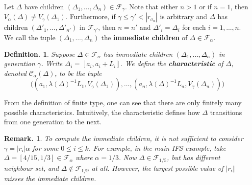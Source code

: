 \documentclass[11pt, a4paper]{memoir}
\theoremstyle{change}
\theoremstyle{plain}
\theoremstyle{nonumberplain}
\newtheorem{definition}{Definition.}
\newtheorem{remark}{Remark.}
\numberwithin{equation}{section}
\begin{document}
Let $\Delta$ have children $(\Delta_1,\ldots,\Delta_n)\in\mathcal{F}_\gamma$.
Note that either $n>1$ or if $n=1$, then $V_\alpha(\Delta)\neq V_\gamma(\Delta_1)$.
Furthermore, if $\gamma\leq\gamma'<|r_{\sigma_u}|$ is arbitrary and $\Delta$ has children $(\Delta'_1,\ldots,\Delta'_{n'})$ in $\mathcal{F}_{\gamma'}$, then $n=n'$ and $\Delta'_i=\Delta_i$ for each $i=1,\ldots,n$.
We call the tuple $(\Delta_1,\ldots,\Delta_n)$ the \textbf{immediate children} of $\Delta\in\mathcal{F}_\alpha$.
\begin{definition}
    Suppose $\Delta\in\mathcal{F}_\alpha$ has immediate children $(\Delta_1,\ldots,\Delta_n)$ in generation $\gamma$.
    Write $\Delta_i=[a_i,a_i+L_i]$.
    We define the \textbf{characteristic} of $\Delta$, denoted $\mathcal{C}_\alpha(\Delta)$, to be the tuple
    \begin{equation*}
        \bigl((a_1,\lambda(\Delta)^{-1}L_1,V_\gamma(\Delta_1)),\ldots,(a_n,\lambda(\Delta)^{-1}L_n,V_\gamma(\Delta_n))\bigr)
    \end{equation*}
\end{definition}
From the definition of finite type, one can see that there are only finitely many possible characteristics.
Intuitively, the characteristic defines how $\Delta$ transitions from one generation to the next.
\begin{remark}
    To compute the immediate children, it is not sufficient to consider $\gamma=|r_i|\alpha$ for some $0\leq i \leq k$.
    For example, in the main IFS example, take $\Delta=[4/15, 1/3]\in\mathcal{F}_\alpha$ where $\alpha=1/3$.
    Now $\Delta\in \mathcal{F}_{1/5}$, but has different neighbour set, and $\Delta\notin\mathcal{F}_{1/9}$ at all.
    However, the largest possible value of $|r_i|$ misses the immediate children.
\end{remark}
\end{document}
